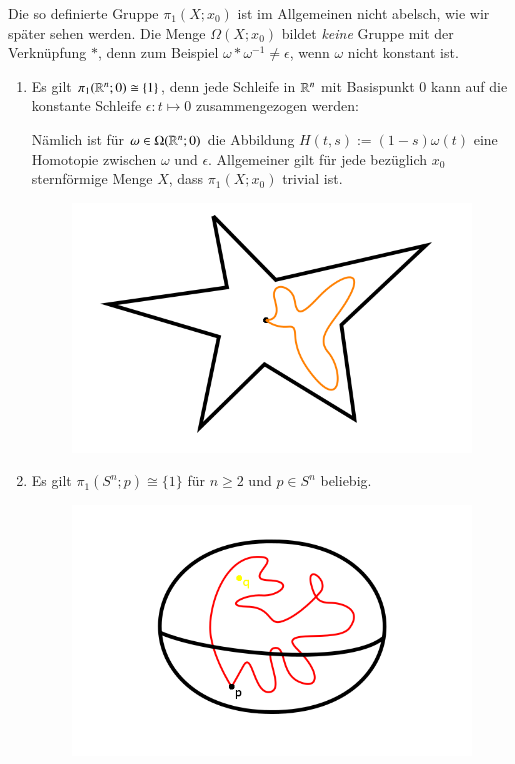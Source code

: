 \documentclass[a4paper,10pt]{scrartcl}
\newcommand{\homo}{\cong}
\begin{document}
Die so definierte Gruppe $\pi_1(X;x_0)$ ist im Allgemeinen nicht abelsch, wie wir später sehen werden. Die Menge $\Omega(X;x_0)$ bildet \emph{keine} Gruppe mit der Verknüpfung $*$, denn zum Beispiel $\omega*\omega^{-1}\neq \epsilon$, wenn $\omega$ nicht konstant ist.
\begin{exs*}
 \begin{enumerate}[(1)]
  \item Es gilt $\pi_1(\R^n;0)\homo \{1\}$, denn jede Schleife in $\mathbb{R}^n$ mit Basispunkt $0$ kann auf die konstante Schleife $\epsilon: t \mapsto 0$ zusammengezogen werden:

Nämlich ist für $\omega \in \Omega(\mathbb{R}^n;0)$ die Abbildung $H(t,s):=(1-s)\omega(t)$ eine Homotopie zwischen $\omega$ und $\epsilon$. Allgemeiner gilt für jede bezüglich $x_0$ sternförmige Menge $X$, dass $\pi_1(X;x_0)$ trivial ist.
\begin{figure}[H]
\centering
\includegraphics[scale=0.3]{fig57.png}
\end{figure}
\item Es gilt $\pi_1(S^n; p) \homo \{1\}$ für $n\ge 2$ und $p\in S^n$ beliebig.
\begin{figure}[H]
\centering
\includegraphics[scale=0.3]{fig58.png}

\end{figure}
\end{enumerate}
\end{exs*}
\end{document}
